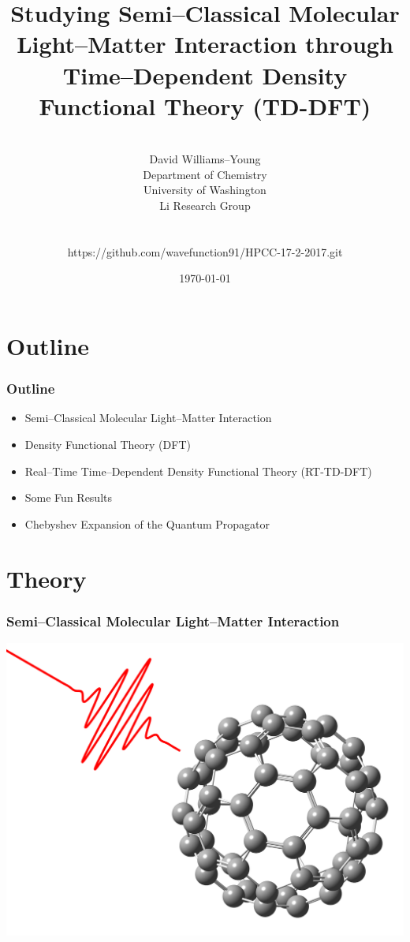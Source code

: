\documentclass{beamer}
\title[]{Studying Semi--Classical Molecular Light--Matter Interaction through
Time--Dependent Density Functional Theory (TD-DFT)}
\author[Li Research Group, University of Washington]{
\\[1\baselineskip]
David Williams--Young \\
Department of Chemistry \\
University of Washington \\
Li Research Group \\
~\\
~\\
https://github.com/wavefunction91/HPCC-17-2-2017.git
}
\date{\today}
\begin{document}
\begin{frame}
\titlepage
\end{frame}


\section{Outline}


\begin{frame}
\frametitle{Outline}

\begin{itemize}
  \item Semi--Classical Molecular Light--Matter Interaction 
  \item Density Functional Theory (DFT)
  \item Real--Time Time--Dependent Density Functional Theory (RT-TD-DFT)
  \item Some Fun Results
  \item Chebyshev Expansion of the Quantum Propagator
\end{itemize}
\end{frame}

\section{Theory}

\begin{frame}
\frametitle{Semi--Classical Molecular Light--Matter Interaction}
\includegraphics[width=\textwidth]{BMF_pulse}
\end{frame}
\end{document}
